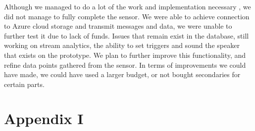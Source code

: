 \documentclass[11pt]{article}
\begin{document}
Although we managed to do a lot of the work and implementation necessary , we did not manage to fully complete the sensor. We were able to achieve connection to Azure cloud storage and transmit messages and data, we were unable to further test it due to lack of funds. Issues that remain exist in the database, still working on stream analytics, the ability to set triggers and sound the speaker that exists on the prototype. We plan to further improve this functionality, and refine data points gathered from the sensor. In terms of improvements we could have made, we could have used a larger budget, or not bought secondaries for certain parts. 

\newpage
\appendix 

\section{Appendix I}
\end{document}
